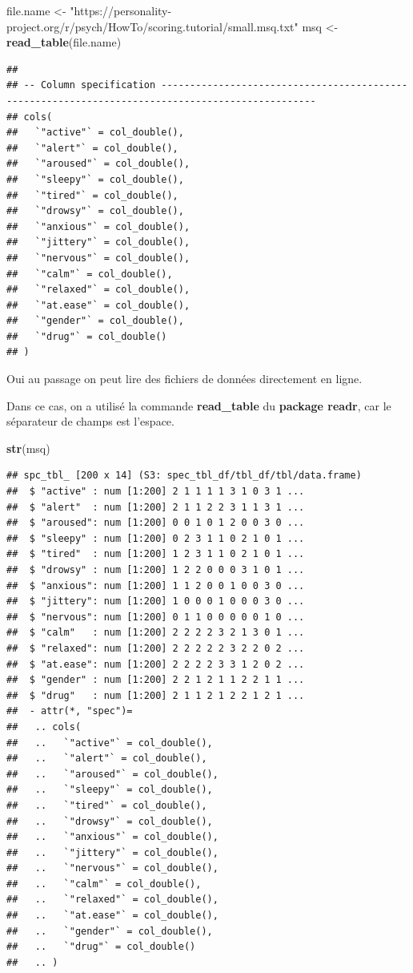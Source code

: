 \documentclass[
]{book}
\newenvironment{Shaded}{\begin{snugshade}}{\end{snugshade}}
\newcommand{\FunctionTok}[1]{\textcolor[rgb]{0.13,0.29,0.53}{\textbf{#1}}}
\newcommand{\NormalTok}[1]{#1}
\newcommand{\OtherTok}[1]{\textcolor[rgb]{0.56,0.35,0.01}{#1}}
\newcommand{\StringTok}[1]{\textcolor[rgb]{0.31,0.60,0.02}{#1}}
\begin{document}
\begin{Shaded}
\begin{Highlighting}[]
\NormalTok{file.name }\OtherTok{\textless{}{-}} \StringTok{"https://personality{-}project.org/r/psych/HowTo/scoring.tutorial/small.msq.txt"}
\NormalTok{msq }\OtherTok{\textless{}{-}} \FunctionTok{read\_table}\NormalTok{(file.name)}
\end{Highlighting}
\end{Shaded}

\begin{verbatim}
## 
## -- Column specification -------------------------------------------------------------------------------------------------
## cols(
##   `"active"` = col_double(),
##   `"alert"` = col_double(),
##   `"aroused"` = col_double(),
##   `"sleepy"` = col_double(),
##   `"tired"` = col_double(),
##   `"drowsy"` = col_double(),
##   `"anxious"` = col_double(),
##   `"jittery"` = col_double(),
##   `"nervous"` = col_double(),
##   `"calm"` = col_double(),
##   `"relaxed"` = col_double(),
##   `"at.ease"` = col_double(),
##   `"gender"` = col_double(),
##   `"drug"` = col_double()
## )
\end{verbatim}

Oui au passage on peut lire des fichiers de données directement en ligne.

Dans ce cas, on a utilisé la commande \textbf{read\_table} du \textbf{package readr}, car
le séparateur de champs est l'espace.

\begin{Shaded}
\begin{Highlighting}[]
\FunctionTok{str}\NormalTok{(msq)}
\end{Highlighting}
\end{Shaded}

\begin{verbatim}
## spc_tbl_ [200 x 14] (S3: spec_tbl_df/tbl_df/tbl/data.frame)
##  $ "active" : num [1:200] 2 1 1 1 1 3 1 0 3 1 ...
##  $ "alert"  : num [1:200] 2 1 1 2 2 3 1 1 3 1 ...
##  $ "aroused": num [1:200] 0 0 1 0 1 2 0 0 3 0 ...
##  $ "sleepy" : num [1:200] 0 2 3 1 1 0 2 1 0 1 ...
##  $ "tired"  : num [1:200] 1 2 3 1 1 0 2 1 0 1 ...
##  $ "drowsy" : num [1:200] 1 2 2 0 0 0 3 1 0 1 ...
##  $ "anxious": num [1:200] 1 1 2 0 0 1 0 0 3 0 ...
##  $ "jittery": num [1:200] 1 0 0 0 1 0 0 0 3 0 ...
##  $ "nervous": num [1:200] 0 1 1 0 0 0 0 0 1 0 ...
##  $ "calm"   : num [1:200] 2 2 2 2 3 2 1 3 0 1 ...
##  $ "relaxed": num [1:200] 2 2 2 2 2 3 2 2 0 2 ...
##  $ "at.ease": num [1:200] 2 2 2 2 3 3 1 2 0 2 ...
##  $ "gender" : num [1:200] 2 2 1 2 1 1 2 2 1 1 ...
##  $ "drug"   : num [1:200] 2 1 1 2 1 2 2 1 2 1 ...
##  - attr(*, "spec")=
##   .. cols(
##   ..   `"active"` = col_double(),
##   ..   `"alert"` = col_double(),
##   ..   `"aroused"` = col_double(),
##   ..   `"sleepy"` = col_double(),
##   ..   `"tired"` = col_double(),
##   ..   `"drowsy"` = col_double(),
##   ..   `"anxious"` = col_double(),
##   ..   `"jittery"` = col_double(),
##   ..   `"nervous"` = col_double(),
##   ..   `"calm"` = col_double(),
##   ..   `"relaxed"` = col_double(),
##   ..   `"at.ease"` = col_double(),
##   ..   `"gender"` = col_double(),
##   ..   `"drug"` = col_double()
##   .. )
\end{verbatim}
\end{document}
